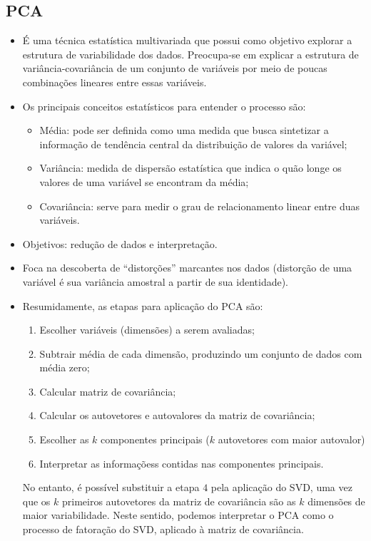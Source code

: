 \documentclass[12pt]{article}
\begin{document}
            \subsection{PCA} 
                \begin{itemize}
                    \item É uma técnica estatística multivariada que possui como objetivo explorar a estrutura de variabilidade dos dados. Preocupa-se  em  explicar  a  estrutura  de  variância-covariância de um conjunto de variáveis por meio de poucas combinações lineares entre essas variáveis. 
                    \item Os principais conceitos estatísticos para entender o processo são:
                        \begin{itemize}
                            \item Média: pode ser definida como uma medida que busca sintetizar a informação de tendência central da distribuição de valores da variável;
                            \item Variância: medida de dispersão estatística que indica o quão longe os valores de uma variável se encontram da média;
                            \item Covariância: serve para medir o grau de relacionamento linear entre duas variáveis.
                        \end{itemize}
                    \item Objetivos: redução de dados e interpretação.
                    \item Foca na descoberta de “distorções” marcantes nos dados (distorção de uma variável é sua variância amostral a partir de sua identidade). 
                    \item Resumidamente, as etapas para aplicação do PCA são:
                        \begin{enumerate}
                            \item Escolher variáveis (dimensões) a serem avaliadas;
                            \item Subtrair média de cada dimensão, produzindo um conjunto de dados com média zero;
                            \item Calcular matriz de covariância;
                            \item Calcular os autovetores e autovalores da matriz de covariância;
                            \item Escolher as $k$ componentes principais ($k$ autovetores com maior autovalor)
                            \item Interpretar as informaçõess contidas nas componentes principais.
                        \end{enumerate}
                        No entanto, é possível substituir a etapa $4$ pela aplicação do SVD, uma vez que os $k$ primeiros autovetores da matriz de covariância são as $k$ dimensões de maior variabilidade. Neste sentido, podemos interpretar o PCA como o processo de fatoração do SVD, aplicado à matriz de covariância.
                \end{itemize}
\end{document}
